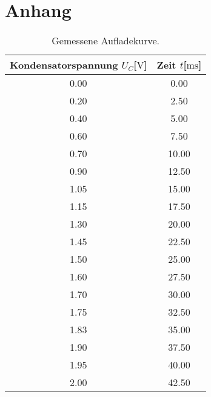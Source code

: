 \section{Anhang}

\begin{table}
    \centering
    \caption{Gemessene Aufladekurve.}
    \label{tab:aufladen}
    \begin{tabular}{c c}
        \toprule
        Kondensatorspannung $U_{C}$[$\si{\volt}$] & Zeit $t$[$\si{\milli\second}$] \\
        \midrule
        0.00     &     0.00\\
        0.20     &     2.50\\
        0.40     &     5.00\\
        0.60     &     7.50\\
        0.70     &     10.00\\
        0.90     &     12.50\\
        1.05     &     15.00\\
        1.15     &     17.50\\   
        1.30     &     20.00\\
        1.45     &     22.50\\  
        1.50     &     25.00\\
        1.60     &     27.50\\
        1.70     &     30.00\\
        1.75     &     32.50\\  
        1.83     &     35.00\\
        1.90     &     37.50\\
        1.95     &     40.00\\
        2.00     &     42.50\\
        \bottomrule
    \end{tabular}
    \end{table}

